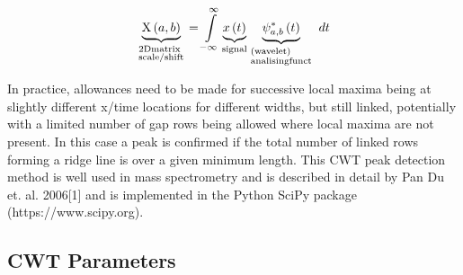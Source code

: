 \documentclass[namedreferences]{solarphysics}
\begin{document}
\begin{article}
\[\underbrace {{\rm{X}}\left( {a,b} \right)}_{\scriptstyle2{\rm{D matrix}}\hfill\atop
	\scriptstyle{\rm{scale/shift}}\hfill} = \int\limits_{ - \infty }^\infty  {\underbrace {x\left( t \right)}_{{\rm{signal}}}\underbrace {\psi _{a,b}^ * \left( t \right)}_{\scriptstyle{\rm{    (wavelet)}}\hfill\atop
		\scriptstyle{\rm{analising funct}}\hfill}\;dt} \]

In practice, allowances need to be made for successive local maxima being at slightly different x/time locations for different widths, but still linked, potentially with a limited number of gap rows being allowed where local maxima are not present. In this case a peak is confirmed if the total number of linked rows forming a ridge line is over a given minimum length.
This CWT peak detection method is well used in mass spectrometry and is described in detail by Pan Du et. al. 2006[1] and is implemented in the Python SciPy package (https://www.scipy.org).


\subsection{CWT Parameters} %
\label{SS-CWT-Parameters}



\color{red}{
	
}
\end{article}
\end{document}

